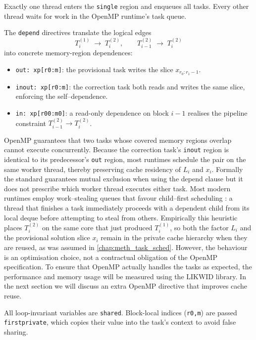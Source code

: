 Exactly one thread enters the
\verb|single| region and enqueues all tasks.  Every other thread waits
for work in the OpenMP runtime’s task queue.

The \verb|depend| directives translate the logical edges
$$
T^{(1)}_i \;\rightarrow\; T^{(2)}_i,
\qquad
T^{(2)}_{i-1}\;\rightarrow\;T^{(2)}_{i}
$$
into concrete memory-region dependences:

\begin{itemize}
\item \verb|out: xp[r0:m]|:  
       the provisional task writes the slice
      $x_{r_0:r_1-1}$.
\item \verb|inout: xp[r0:m]|:  
      the correction task both reads and writes the same slice,
      enforcing the self–dependence.
\item \verb|in: xp[r00:m0]|:  
      a read-only dependence on block $i-1$ realises the pipeline
      constraint $T^{(2)}_{i-1}\!\rightarrow T^{(2)}_{i}$.
\end{itemize}

OpenMP guarantees that two tasks whose covered memory regions overlap
cannot execute concurrently.  Because the correction task’s
\verb|inout| region is identical to its predecessor’s \verb|out|
region, most runtimes schedule the pair on the same worker
thread, thereby preserving cache residency of $L_i$ and $x_i$.
Formally the standard guarantees mutual exclusion when using the depend clause but
it does not prescribe which worker thread executes either
task.
Most modern runtimes employ work–stealing queues that favour
child–first scheduling \cite{Robison2014N3872}:
a thread that finishes a task immediately proceeds with a dependent
child from its local deque before attempting to steal from others.
Empirically this heuristic places $T^{(2)}_{i}$ on the same core that
just produced $T^{(1)}_{i}$, so both the factor $L_i$ and the provisional solution slice $x_i$
remain in the private cache hierarchy when they are reused, as was assumed in \ref{chap:meth_task_sched}.
However, the behaviour is an optimisation choice, not a contractual obligation of the OpenMP specification. To ensure that OpenMP actually handles the tasks as expected, the performance and memory usage will be measured using the LIKWID library.
In the next section we will discuss an extra OpenMP directive that improves cache reuse.

All loop-invariant variables are \verb|shared|.
Block-local indices (\verb|r0,m|) are passed \verb|firstprivate|,
which copies their value into the task’s context to avoid false
sharing.

